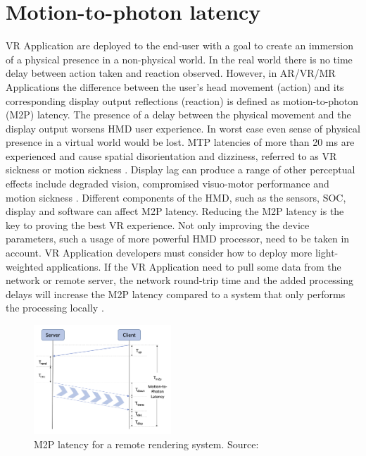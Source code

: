\section{Motion-to-photon latency}
\label{sec:theorie:m2p}
VR Application are deployed to the end-user with a goal to create an immersion of a physical presence in a non-physical world. In the real world there is no time delay between action taken and reaction observed. However, in AR/VR/MR Applications the difference between the user's head movement (action) and its corresponding display output reflections (reaction) is defined as motion-to-photon (M2P) latency. The presence of a delay between the physical movement and the display output worsens HMD user experience. In worst case even sense of physical presence in a virtual world would be lost. MTP latencies of more than 20 ms are experienced and cause spatial disorientation and dizziness, referred to as VR sickness or motion sickness \cite{delay_sickness, serhan_kalman}. Display lag can produce a range of other perceptual effects include degraded vision, compromised visuo-motor performance and motion sickness \cite{delay_sickness}. Different components of the HMD, such as the sensors, SOC, display and software can affect M2P latency. Reducing the M2P latency is the key to proving the best VR experience. Not only improving the device parameters, such a usage of more powerful HMD processor, need to be taken in account. VR Application developers must consider how to deploy more light-weighted applications. If the VR Application need to pull some data from the network or remote server, the network round-trip time and the added processing delays will increase the M2P latency compared to a system that only performs the processing locally \cite{serhan_kalman}.\\

\begin{figure}
	\centering
	\includegraphics[width=0.46\textwidth]{gfx/m2p.png}
	\caption{\label{fig:m2p}M2P latency for a remote rendering system. Source: \cite{serhan_cloud_streaming}}
\end{figure}

